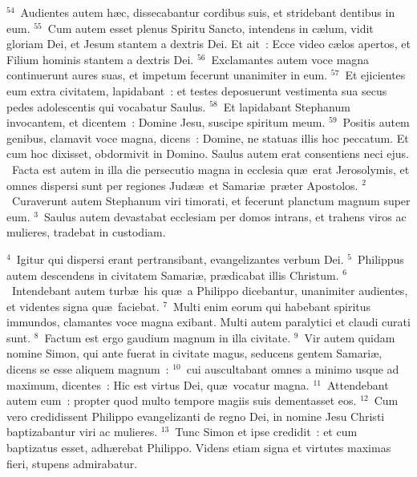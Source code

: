 ${}^{54}$~Audientes autem h\ae c, dissecabantur cordibus suis, et stridebant dentibus in eum.
${}^{55}$~Cum autem esset plenus Spiritu Sancto, intendens in c\ae lum, vidit gloriam Dei, et Jesum stantem a dextris Dei. Et ait~: Ecce video c\ae los apertos, et Filium hominis stantem a dextris Dei.
${}^{56}$~Exclamantes autem voce magna continuerunt aures suas, et impetum fecerunt unanimiter in eum.
${}^{57}$~Et ejicientes eum extra civitatem, lapidabant~: et testes deposuerunt vestimenta sua secus pedes adolescentis qui vocabatur Saulus.
${}^{58}$~Et lapidabant Stephanum invocantem, et dicentem~: Domine Jesu, suscipe spiritum meum.
${}^{59}$~Positis autem genibus, clamavit voce magna, dicens~: Domine, ne statuas illis hoc peccatum. Et cum hoc dixisset, obdormivit in Domino. Saulus autem erat consentiens neci ejus.
~Facta est autem in illa die persecutio magna in ecclesia qu\ae\ erat Jerosolymis, et omnes dispersi sunt per regiones Jud\ae \ae\ et Samari\ae\ pr\ae ter Apostolos.
${}^{2}$~Curaverunt autem Stephanum viri timorati, et fecerunt planctum magnum super eum.
${}^{3}$~Saulus autem devastabat ecclesiam per domos intrans, et trahens viros ac mulieres, tradebat in custodiam.


${}^{4}$~Igitur qui dispersi erant pertransibant, evangelizantes verbum Dei.
${}^{5}$~Philippus autem descendens in civitatem Samari\ae , pr\ae dicabat illis Christum.
${}^{6}$~Intendebant autem turb\ae\ his qu\ae\ a Philippo dicebantur, unanimiter audientes, et videntes signa qu\ae\ faciebat.
${}^{7}$~Multi enim eorum qui habebant spiritus immundos, clamantes voce magna exibant. Multi autem paralytici et claudi curati sunt.
${}^{8}$~Factum est ergo gaudium magnum in illa civitate.
${}^{9}$~Vir autem quidam nomine Simon, qui ante fuerat in civitate magus, seducens gentem Samari\ae , dicens se esse aliquem magnum~:
${}^{10}$~cui auscultabant omnes a minimo usque ad maximum, dicentes~: Hic est virtus Dei, qu\ae\ vocatur magna.
${}^{11}$~Attendebant autem eum~: propter quod multo tempore magiis suis dementasset eos.
${}^{12}$~Cum vero credidissent Philippo evangelizanti de regno Dei, in nomine Jesu Christi baptizabantur viri ac mulieres.
${}^{13}$~Tunc Simon et ipse credidit~: et cum baptizatus esset, adh\ae rebat Philippo. Videns etiam signa et virtutes maximas fieri, stupens admirabatur.


